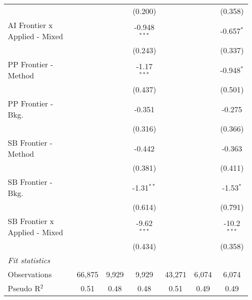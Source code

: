 \begin{tabular}{lcccccc}
                                 &              &              & (0.200)        &         &         & (0.358)\\   
   AI Frontier x Applied - Mixed &              &              & -0.948$^{***}$ &         &         & -0.657$^{*}$\\   
                                 &              &              & (0.243)        &         &         & (0.337)\\   
   PP Frontier - Method          &              &              & -1.17$^{***}$  &         &         & -0.948$^{*}$\\   
                                 &              &              & (0.437)        &         &         & (0.501)\\   
   PP Frontier - Bkg.            &              &              & -0.351         &         &         & -0.275\\   
                                 &              &              & (0.316)        &         &         & (0.366)\\   
   SB Frontier - Method          &              &              & -0.442         &         &         & -0.363\\   
                                 &              &              & (0.381)        &         &         & (0.411)\\   
   SB Frontier - Bkg.            &              &              & -1.31$^{**}$   &         &         & -1.53$^{*}$\\   
                                 &              &              & (0.614)        &         &         & (0.791)\\   
   SB Frontier x Applied - Mixed &              &              & -9.62$^{***}$  &         &         & -10.2$^{***}$\\   
                                 &              &              & (0.434)        &         &         & (0.358)\\   
   \midrule
   \emph{Fit statistics}\\
   Observations                  & 66,875       & 9,929        & 9,929          & 43,271  & 6,074   & 6,074\\  
   Pseudo R$^2$                  & 0.51         & 0.48         & 0.48           & 0.51    & 0.49    & 0.49\\  
   

\end{tabular}
